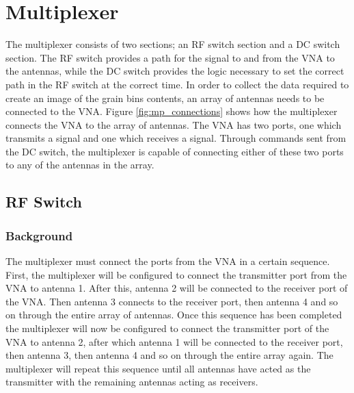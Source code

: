

\chapter{Multiplexer}
\label{sec:Multiplexer}

The multiplexer consists of two sections; an RF switch section and a DC switch section. The RF switch provides a path for the signal to and from the VNA to the antennas, while the DC switch provides the logic necessary to set the correct path in the RF switch at the correct time. In order to collect the data required to create an image of the grain bins contents, an array of antennas needs to be connected to the VNA. Figure \ref{fig:mp_connections} shows how the multiplexer connects the VNA to the array of antennas. The VNA has two ports, one which transmits a signal and one which receives a signal. Through commands sent from the DC switch, the multiplexer is capable of connecting either of these two ports to any of the antennas in the array.

\section{RF Switch}

\subsection{Background}

The multiplexer must connect the ports from the VNA in a certain sequence. First, the multiplexer will be configured to connect the transmitter port from the VNA to antenna 1. After this, antenna 2 will be connected to the receiver port of the VNA. Then antenna 3 connects to the receiver port, then antenna 4 and so on through the entire array of antennas. Once this sequence has been completed the multiplexer will now be configured to connect the transmitter port of the VNA to antenna 2, after which antenna 1 will be connected to the receiver port, then antenna 3, then antenna 4 and so on through the entire array again. The multiplexer will repeat this sequence until all antennas have acted as the transmitter with the remaining antennas acting as receivers.

